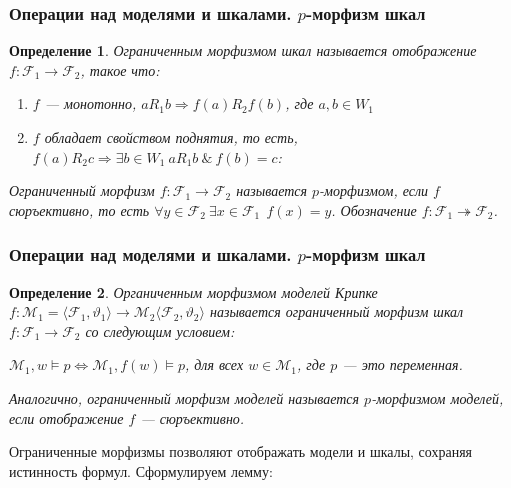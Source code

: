 \documentclass[pdf,utf8,russian,aspectratio=169]{beamer}
\newtheorem{defin}{Определение}
\begin{document}
\begin{frame}
  \frametitle{Операции над моделями и шкалами. $p$-морфизм шкал}
  \begin{defin} Ограниченным морфизмом шкал называется отображение $f : \mathcal{F}_1 \to \mathcal{F}_2$, такое что:
    \begin{enumerate}
      \item $f$ --- монотонно, $a R_1 b \Rightarrow f (a) R_2 f (b)$, где $a, b \in W_1$
      \item $f$ обладает свойством поднятия, то есть, $f(a) R_2 c \Rightarrow \exists b \in W_1 \: a R_1 b \: \& \: f(b) = c$:
      \begin{small}
    \end{small}
  \end{enumerate}

  Ограниченный морфизм $f : \mathcal{F}_1 \to \mathcal{F}_2$ называется $p$-морфизмом, если $f$ сюръективно, то есть $\forall y \in \mathcal{F}_2 \: \exists x \in \mathcal{F}_1 \:\: f(x) = y$. Обозначение $f : \mathcal{F}_1 \twoheadrightarrow \mathcal{F}_2$.
  \end{defin}
\end{frame}

\begin{frame}
  \frametitle{Операции над моделями и шкалами. $p$-морфизм шкал}
  \begin{defin}
    Органиченным морфизмом моделей Крипке $f : \mathcal{M}_1 = \langle \mathcal{F}_1, \vartheta_1 \rangle \to \mathcal{M}_2 \langle \mathcal{F}_2, \vartheta_2 \rangle$ называется ограниченный морфизм шкал $f : \mathcal{F}_1 \to \mathcal{F}_2$ со следующим условием:

    \begin{center}
      $\mathcal{M}_1, w \models p \Leftrightarrow \mathcal{M}_1, f(w) \models p$, для всех $w \in \mathcal{M}_1$, где $p$ --- это переменная.
    \end{center}

    Аналогично, ограниченный морфизм моделей называется $p$-морфизмом моделей, если отображение $f$ --- сюръективно.
  \end{defin}

  Ограниченные морфизмы позволяют отображать модели и шкалы, сохраняя истинность формул. Сформулируем лемму:
\end{frame}
\end{document}
